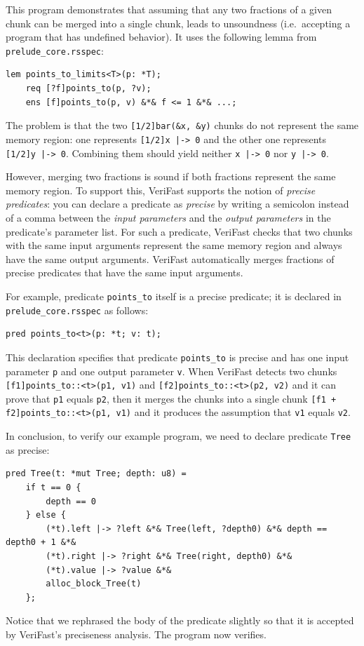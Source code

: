 \documentclass{article}
\begin{document}
This program demonstrates that assuming that any two fractions
of a given chunk can be merged into a single chunk, leads to
unsoundness (i.e.~accepting a program that has undefined behavior).
It uses the following lemma
from \lstinline|prelude_core.rsspec|:
\begin{lstlisting}
lem points_to_limits<T>(p: *T);
    req [?f]points_to(p, ?v);
    ens [f]points_to(p, v) &*& f <= 1 &*& ...;
\end{lstlisting}

The problem is that the two \lstinline|[1/2]bar(&x, &y)| chunks
do not represent the same memory region: one represents
\lstinline![1/2]x |-> 0! and the other one represents
\lstinline![1/2]y |-> 0!. Combining them should yield neither
\lstinline!x |-> 0! nor \lstinline!y |-> 0!.

However, merging two fractions is sound if both fractions
represent the same memory region. To support this, VeriFast
supports the notion of \emph{precise predicates}: you can
declare a predicate as \emph{precise} by writing a semicolon
instead of a comma between the \emph{input parameters} and the
\emph{output parameters} in the predicate's parameter list. For
such a predicate, VeriFast checks that two chunks with the same
input arguments represent the same memory region and always
have the same output arguments. VeriFast automatically merges
fractions of precise predicates that have the same input
arguments.

For example, predicate \lstinline|points_to| itself is a precise
predicate; it is declared in \lstinline|prelude_core.rsspec| as follows:
\begin{lstlisting}
pred points_to<t>(p: *t; v: t);
\end{lstlisting}
This declaration specifies that predicate \lstinline|points_to|
is precise and has one input parameter \lstinline|p| and one
output parameter \lstinline|v|. When VeriFast detects two
chunks \lstinline|[f1]points_to::<t>(p1, v1)| and
\lstinline|[f2]points_to::<t>(p2, v2)| and it can prove that
\lstinline|p1| equals \lstinline|p2|, then it merges the chunks
into a single chunk \lstinline|[f1 + f2]points_to::<t>(p1, v1)| and it
produces the assumption that \lstinline|v1| equals
\lstinline|v2|.

In conclusion, to verify our example program, we need to
declare predicate \lstinline|Tree| as precise:
\begin{lstlisting}
pred Tree(t: *mut Tree; depth: u8) =
    if t == 0 {
        depth == 0
    } else {
        (*t).left |-> ?left &*& Tree(left, ?depth0) &*& depth == depth0 + 1 &*&
        (*t).right |-> ?right &*& Tree(right, depth0) &*&
        (*t).value |-> ?value &*&
        alloc_block_Tree(t)
    };
\end{lstlisting}
Notice that we rephrased the body of the predicate slightly so
that it is accepted by VeriFast's preciseness analysis. The
program now verifies.
\end{document}

